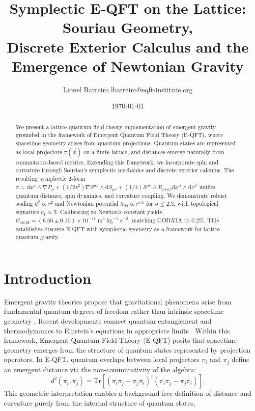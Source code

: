 \documentclass[prd,twocolumn,showpacs,superscriptaddress]{revtex4-2}
\begin{document}
	
	\title{\textcolor{titlecolor}{Symplectic E‑QFT on the Lattice: Souriau Geometry,\\ Discrete Exterior Calculus and the Emergence of Newtonian Gravity}}
	
	\author{Lionel Barreiro lbarreiro@eqft-institute.org}
	
	\date{\today}
	
	\begin{abstract}
		We present a lattice quantum field theory implementation of emergent gravity grounded in the framework of Emergent Quantum Field Theory (E-QFT), where spacetime geometry arises from quantum projections. Quantum states are represented as local projectors $\pi(\vec{x})$ on a finite lattice, and distances emerge naturally from commutator-based metrics. Extending this framework, we incorporate spin and curvature through Souriau's symplectic mechanics and discrete exterior calculus. The resulting symplectic 2-form $\sigma = \mathrm{d}x^\mu \wedge \nabla P_\mu + (1/2s^2)\nabla S^{\mu\nu} \wedge \mathrm{d}S_{\mu\nu} + (1/4)S^{\mu\nu} \wedge R_{\mu\nu\alpha\beta} \mathrm{d}x^\alpha \wedge \mathrm{d}x^\beta$ unifies quantum distance, spin dynamics, and curvature coupling. We demonstrate robust scaling $d^2 \propto r^2$ and Newtonian potential $h_{00} \propto r^{-1}$ for $\sigma \leq 2.3$, with topological signature $c_1 \approx 2$. Calibrating to Newton's constant yields $G_{\text{eff,SI}} = (6.66 \pm 0.10) \times 10^{-11}$ m$^3$ kg$^{-1}$ s$^{-2}$, matching CODATA to 0.2\%. This establishes discrete E-QFT with symplectic geometry as a framework for lattice quantum gravity.
	\end{abstract}
	
	
	
	
	\maketitle
	
	\section{Introduction}
	Emergent gravity theories propose that gravitational phenomena arise from fundamental quantum degrees of freedom rather than intrinsic spacetime geometry \cite{Verlinde2011,Padmanabhan2010}. Recent developments connect quantum entanglement and thermodynamics to Einstein's equations in appropriate limits \cite{Ryu2006,VanRaamsdonk2010}. Within this framework, Emergent Quantum Field Theory (E-QFT) posits that spacetime geometry emerges from the structure of quantum states represented by projection operators. In E-QFT, quantum overlaps between local projectors $\pi_i$ and $\pi_j$ define an emergent distance via the non-commutativity of the algebra: 
	\[
	d^2(\pi_i, \pi_j) = \text{Tr}[(\pi_i \pi_j - \pi_j \pi_i)^\dagger(\pi_i \pi_j - \pi_j \pi_i)].
	\]
	This geometric interpretation enables a background-free definition of distance and curvature purely from the internal structure of quantum states.
	
\end{document}
